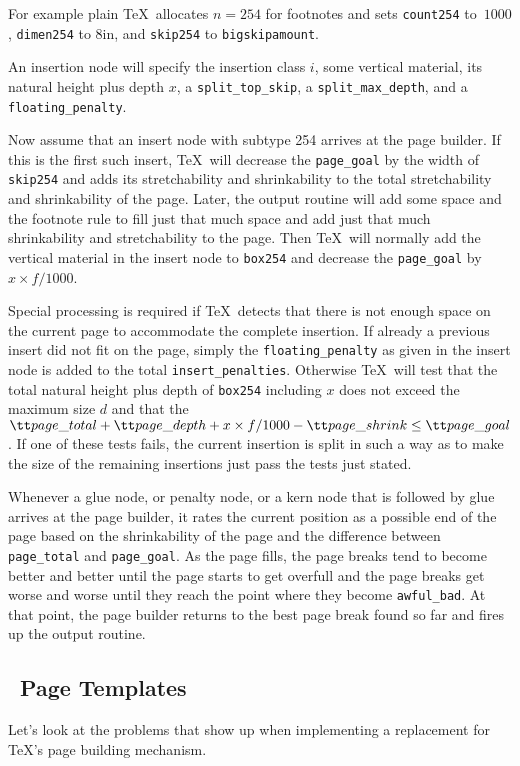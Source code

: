 For example plain \TeX\ allocates $n=254$ for footnotes and sets
{\tt count254} to~$1000$, {\tt dimen254} to 8in, and {\tt skip254} to 
{\tt \BS big\-skip\-amount}.

An insertion node will specify the insertion class $i$, some vertical material,
its natural height plus depth $x$, a {\tt split\-\_top\-\_skip}, a {\tt split\-\_max\_depth},
and a {\tt floa\-ting\-\_pe\-nal\-ty}. 


Now assume that an insert node with subtype 254 arrives at the page builder.
If this is the first such insert, \TeX\ will decrease the {\tt page\_goal}
by the width of {\tt skip254} and adds its stretchability and shrinkability
to the total stretchability and shrinkability of the page. Later,
the output routine will add some space and the footnote rule to fill just that
much space and add just that much shrinkability and stretchability to the page.
Then \TeX\ will normally add the vertical material in the insert node to
{\tt box254} and decrease the {\tt page\_goal} by $x\times f/1000$.

Special processing is required if \TeX\ detects that there is not enough space on
the current page to accommodate the complete insertion.
If already a previous insert did not fit on the page, simply the {\tt floating\_penalty}
as given in the insert node is added to the total {\tt insert\_penalties}.
Otherwise \TeX\ will test that the total natural height plus depth of {\tt box254} 
including $x$ does not exceed the maximum size $d$ and that the 
${\tt page\_total} + {\tt page\_depth} + x\times f/1000 - {\tt page\_shrink} \le {\tt page\_goal}$.
If one of these tests fails, the current insertion
is split in such a way as to make the size of the remaining insertions just pass the tests
just stated.

Whenever a glue node, or penalty node, or a kern node that is followed by glue arrives
at the page builder, it rates the current position as a possible end of the page based on
the shrinkability of the page and the difference between {\tt page\_total} and {\tt page\_goal}.
As the page fills, the page breaks tend to become better and better until the
page starts to get overfull and the page breaks get worse and worse until
they reach the point where they become {\tt awful\_bad}. At that point,
the page builder returns to the best page break found so far and fires up the 
output routine.


\subsection{\HINT\ Page Templates}
Let's look at the problems that show up when implementing a replacement for \TeX's
page building mechanism.

